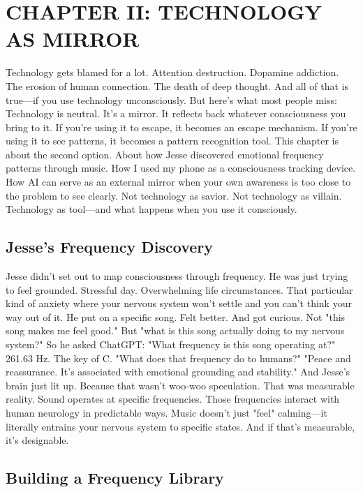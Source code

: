 \cleardoublepage

\chapter{CHAPTER II: TECHNOLOGY AS MIRROR}

Technology gets blamed for a lot.
Attention destruction. Dopamine addiction. The erosion of human connection. The death of deep thought.
And all of that is true—if you use technology unconsciously.
But here's what most people miss: Technology is neutral. It's a mirror.
It reflects back whatever consciousness you bring to it. If you're using it to escape, it becomes an escape mechanism. If you're using it to see patterns, it becomes a pattern recognition tool.
This chapter is about the second option.
About how Jesse discovered emotional frequency patterns through music. How I used my phone as a consciousness tracking device. How AI can serve as an external mirror when your own awareness is too close to the problem to see clearly.
Not technology as savior. Not technology as villain. Technology as tool—and what happens when you use it consciously.

\section{Jesse's Frequency Discovery}

Jesse didn't set out to map consciousness through frequency. He was just trying to feel grounded.
Stressful day. Overwhelming life circumstances. That particular kind of anxiety where your nervous system won't settle and you can't think your way out of it.
He put on a specific song. Felt better. And got curious.
Not "this song makes me feel good." But "what is this song actually doing to my nervous system?"
So he asked ChatGPT: "What frequency is this song operating at?"
261.63 Hz. The key of C.
"What does that frequency do to humans?"
"Peace and reassurance. It's associated with emotional grounding and stability."
And Jesse's brain just lit up.
Because that wasn't woo-woo speculation. That was measurable reality. Sound operates at specific frequencies. Those frequencies interact with human neurology in predictable ways. Music doesn't just "feel" calming—it literally entrains your nervous system to specific states.
And if that's measurable, it's designable.

\section{Building a Frequency Library}

